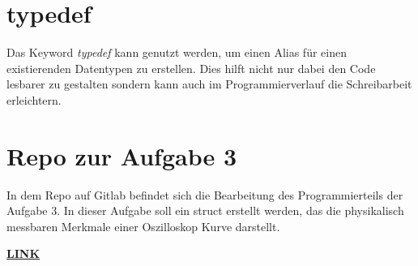 \section{typedef}
Das Keyword \textit{typedef} kann genutzt werden, um einen Alias für einen existierenden Datentypen zu erstellen.
Dies hilft nicht nur dabei den Code lesbarer zu gestalten sondern kann auch im Programmierverlauf die Schreibarbeit erleichtern\cite{bökelmann:2023}.

\section{Repo zur Aufgabe 3}
In dem Repo auf Gitlab befindet sich die Bearbeitung des Programmierteils der Aufgabe 3. 
In dieser Aufgabe soll ein struct erstellt werden, das die physikalisch messbaren Merkmale einer Oszilloskop Kurve darstellt.\par
\href{https://gitlab.thga.de/daniel.krueger/pruefung_sose_2023_aufgabe_3_struct}{\textbf{LINK}} 
